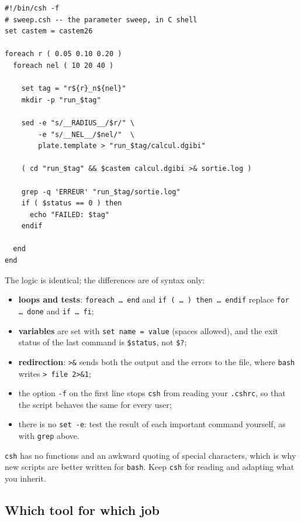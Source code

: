 \begin{codebox}
\begin{verbatim}
#!/bin/csh -f
# sweep.csh -- the parameter sweep, in C shell
set castem = castem26

foreach r ( 0.05 0.10 0.20 )
  foreach nel ( 10 20 40 )

    set tag = "r${r}_n${nel}"
    mkdir -p "run_$tag"

    sed -e "s/__RADIUS__/$r/" \
        -e "s/__NEL__/$nel/"  \
        plate.template > "run_$tag/calcul.dgibi"

    ( cd "run_$tag" && $castem calcul.dgibi >& sortie.log )

    grep -q 'ERREUR' "run_$tag/sortie.log"
    if ( $status == 0 ) then
      echo "FAILED: $tag"
    endif

  end
end
\end{verbatim}
\end{codebox}

\noindent The logic is identical; the differences are of syntax only:

\begin{itemize}
\item \textbf{loops and tests}: \texttt{foreach \ldots\ end} and
  \texttt{if ( \ldots\ ) then \ldots\ endif} replace \texttt{for \ldots\ done}
  and \texttt{if \ldots\ fi};
\item \textbf{variables} are set with \texttt{set name = value} (spaces
  allowed), and the exit status of the last command is \texttt{\$status}, not
  \texttt{\$?};
\item \textbf{redirection}: \texttt{>\&} sends both the output and the errors
  to the file, where \texttt{bash} writes \texttt{> file 2>\&1};
\item the option \texttt{-f} on the first line stops \texttt{csh} from reading
  your \texttt{.cshrc}, so that the script behaves the same for every user;
\item there is no \texttt{set -e}: test the result of each important command
  yourself, as with \texttt{grep} above.
\end{itemize}

\noindent \texttt{csh} has no functions and an awkward quoting of special
characters, which is why new scripts are better written for \texttt{bash}.
Keep \texttt{csh} for reading and adapting what you inherit.

\subsection*{Which tool for which job}

